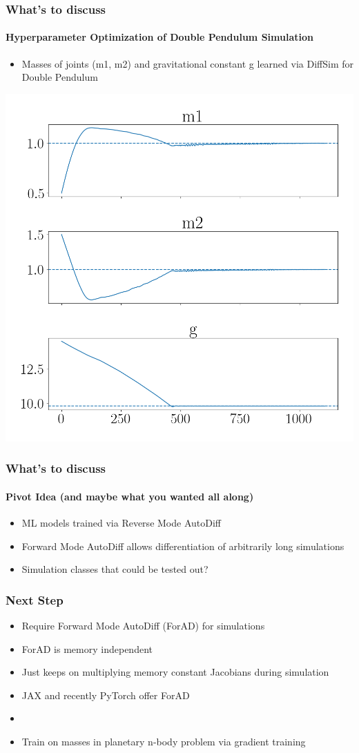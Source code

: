 \documentclass[usenames, dvipsnames, t]{beamer}
\begin{document}
\begin{frame}
	\frametitle{What's to discuss}
	\framesubtitle{Hyperparameter Optimization of Double Pendulum Simulation}
	\begin{itemize}
		\item Masses of joints (m1, m2) and gravitational constant g learned via DiffSim for Double Pendulum
	\end{itemize}
	\centering
	\includegraphics[height=0.7\textheight]{myplot.png}
\end{frame}

\begin{frame}
	\frametitle{What's to discuss}
	\framesubtitle{Pivot Idea (and maybe what you wanted all along)}
	\begin{itemize}
		\item ML models trained via Reverse Mode AutoDiff
		\item Forward Mode AutoDiff allows differentiation of arbitrarily long simulations
		\item Simulation classes that could be tested out?
	\end{itemize}
\end{frame}

\begin{frame}
	\frametitle{Next Step}
	\begin{itemize}
		\item Require Forward Mode AutoDiff (ForAD) for simulations
		\item ForAD is memory independent
		\item Just keeps on multiplying memory constant Jacobians during simulation
		\item JAX and recently PyTorch offer ForAD
		\item[] 
		\item Train on masses in planetary n-body problem via gradient training
	\end{itemize}
\end{frame}
\end{document}
